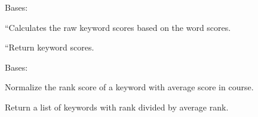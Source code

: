 \documentclass[letterpaper,10pt,english]{sphinxmanual}
\begin{document}

\begin{fulllineitems}
\label{cv_kickstarter:cv_kickstarter.academic_skill_set.KeywordScoreCalculator}
Bases: 

``Calculates the raw keyword scores based on the word scores.

\begin{fulllineitems}
\label{cv_kickstarter:cv_kickstarter.academic_skill_set.KeywordScoreCalculator.keyword_scorer}
``Return keyword scores.

\end{fulllineitems}


\end{fulllineitems}


\begin{fulllineitems}
\label{cv_kickstarter:cv_kickstarter.academic_skill_set.KeywordScoreNormalizer}
Bases: 

Normalize the rank score of a keyword with average score in course.

\begin{fulllineitems}
\label{cv_kickstarter:cv_kickstarter.academic_skill_set.KeywordScoreNormalizer.normalized_keyword_score}
Return a list of keywords with rank divided by average rank.

\end{fulllineitems}


\end{fulllineitems}

\end{document}

